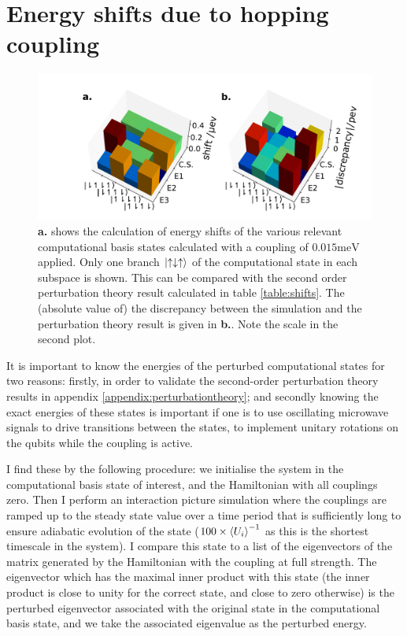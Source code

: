 \documentclass{report}
\begin{document}
\section{Energy shifts due to hopping coupling}

\begin{figure}[ht]
    \centering
    \includegraphics[scale = 0.4]{Figures/shifts.pdf}
    \caption{\textbf{a.} shows the calculation of energy shifts of the various relevant computational basis states calculated with a coupling of $0.015\unit{\milli\electronvolt}$ applied. Only one branch $\ket{\uparrow\downarrow\uparrow}$ of the computational state in each subspace is shown. This can be compared with the second order perturbation theory result calculated in table \ref{table:shifts}. The (absolute value of) the discrepancy between the simulation and the perturbation theory result is given in \textbf{b.}. Note the scale in the second plot.
    \label{fig:shifts}}
\end{figure}
It is important to know the energies of the perturbed computational states for two reasons: firstly, in order to validate the second-order perturbation theory results in appendix \ref{appendix:perturbationtheory}; and secondly knowing the exact energies of these states is important if one is to use oscillating microwave signals to drive transitions between the states, to implement unitary rotations on the qubits while the coupling is active.

I find these by the following procedure: we initialise the system in the computational basis state of interest, and the Hamiltonian with all couplings zero. Then I perform an interaction picture simulation where the couplings are ramped up to the steady state value over a time period that is sufficiently long to ensure adiabatic evolution of the state ($100\times\braket{U_i}^{-1}$ as this is the shortest timescale in the system). I compare this state to a list of the eigenvectors of the matrix generated by the Hamiltonian with the coupling at full strength. The eigenvector which has the maximal inner product with this state (the inner product is close to unity for the correct state, and close to zero otherwise) is the perturbed eigenvector associated with the original state in the computational basis state, and we take the associated eigenvalue as the perturbed energy.
\end{document}
